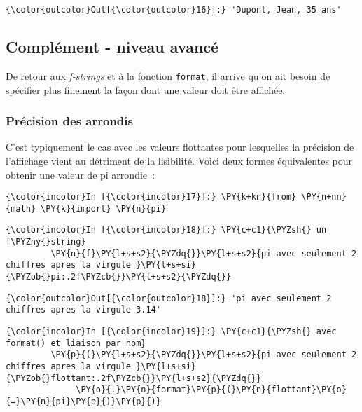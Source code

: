 \begin{Verbatim}[commandchars=\\\{\}]
{\color{outcolor}Out[{\color{outcolor}16}]:} 'Dupont, Jean, 35 ans'
\end{Verbatim}
            
    \hypertarget{compluxe9ment---niveau-avancuxe9}{%
\subsection{Complément - niveau
avancé}\label{compluxe9ment---niveau-avancuxe9}}

    De retour aux \emph{f-strings} et à la fonction \texttt{format}, il
arrive qu'on ait besoin de spécifier plus finement la façon dont une
valeur doit être affichée.

    \hypertarget{pruxe9cision-des-arrondis}{%
\subsubsection{Précision des arrondis}\label{pruxe9cision-des-arrondis}}

    C'est typiquement le cas avec les valeurs flottantes pour lesquelles la
précision de l'affichage vient au détriment de la lisibilité. Voici deux
formes équivalentes pour obtenir une valeur de pi arrondie~:

    \begin{Verbatim}[commandchars=\\\{\}]
{\color{incolor}In [{\color{incolor}17}]:} \PY{k+kn}{from} \PY{n+nn}{math} \PY{k}{import} \PY{n}{pi}
\end{Verbatim}


    \begin{Verbatim}[commandchars=\\\{\}]
{\color{incolor}In [{\color{incolor}18}]:} \PY{c+c1}{\PYZsh{} un f\PYZhy{}string}
         \PY{n}{f}\PY{l+s+s2}{\PYZdq{}}\PY{l+s+s2}{pi avec seulement 2 chiffres apres la virgule }\PY{l+s+si}{\PYZob{}pi:.2f\PYZcb{}}\PY{l+s+s2}{\PYZdq{}}
\end{Verbatim}


\begin{Verbatim}[commandchars=\\\{\}]
{\color{outcolor}Out[{\color{outcolor}18}]:} 'pi avec seulement 2 chiffres apres la virgule 3.14'
\end{Verbatim}
            
    \begin{Verbatim}[commandchars=\\\{\}]
{\color{incolor}In [{\color{incolor}19}]:} \PY{c+c1}{\PYZsh{} avec format() et liaison par nom}
         \PY{p}{(}\PY{l+s+s2}{\PYZdq{}}\PY{l+s+s2}{pi avec seulement 2 chiffres apres la virgule }\PY{l+s+si}{\PYZob{}flottant:.2f\PYZcb{}}\PY{l+s+s2}{\PYZdq{}}
              \PY{o}{.}\PY{n}{format}\PY{p}{(}\PY{n}{flottant}\PY{o}{=}\PY{n}{pi}\PY{p}{)}\PY{p}{)}
\end{Verbatim}



